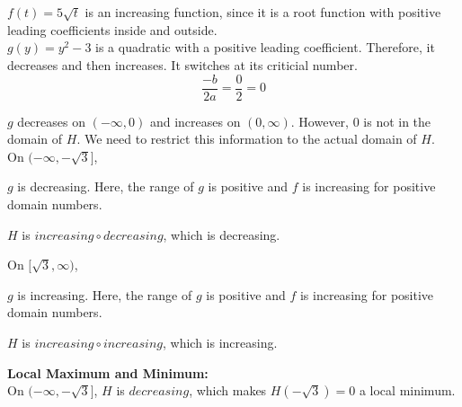 \documentclass{ximera}
\begin{document}
$f(t) = 5 \sqrt{t}$ is an increasing function, since it is a root function with positive leading coefficients inside and outside. \\

$g(y) = y^2 - 3$ is a quadratic with a positive leading coefficient.  Therefore, it decreases and then increases.   It switches at its criticial number.\\



\[
\frac{-b}{2 a} = \frac{0}{2} = 0
\]


$g$ decreases on $(-\infty, 0)$ and increases on $(0, \infty)$.  However, $0$ is not in the domain of $H$. We need to restrict this information to the actual domain of $H$. \\





On $(-\infty, -\sqrt{3}]$, 


$g$ is decreasing. Here, the range of $g$ is positive and $f$ is increasing for positive domain numbers. \\ 



\begin{center}
$H$ is $increasing \circ decreasing$, which is decreasing. \\
\end{center}





On $[\sqrt{3}, \infty)$, 


$g$ is increasing. Here, the range of $g$ is positive and $f$ is increasing for positive domain numbers. \\ 


\begin{center}
$H$ is $increasing \circ increasing$, which is increasing. \\
\end{center}













\textbf{\textcolor{blue!55!black}{Local Maximum and Minimum:}} \\





On $(-\infty, -\sqrt{3}]$, $H$ is $decreasing$, which makes $H(-\sqrt{3}) = 0$ a local minimum.  \\
\end{document}
